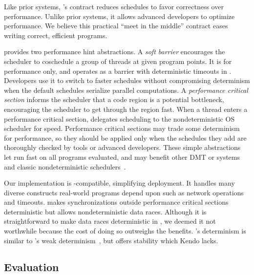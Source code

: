 Like prior systems, \parrot's contract reduces schedules to favor correctness 
over performance.  Unlike prior systems, it allows advanced developers
to optimize performance.  We believe this practical ``meet in the
middle'' contract eases writing correct, efficient programs.



\parrot provides two performance hint abstractions.  A \emph{soft
  barrier} encourages the scheduler to coschedule a group of threads at
given program points.  It is for performance only, and operates as a
barrier with deterministic timeouts in \parrot.  Developers use it to switch
to faster schedules without compromising determinism
when the default schedules serialize parallel
computations.  A \emph{performance critical section}
informs the scheduler that a code region is a potential
bottleneck, encouraging the scheduler to get through the region fast.
When a thread enters a performance critical section, \parrot delegates 
scheduling to the
nondeterministic OS scheduler for speed.  
Performance critical sections may trade some determinism for
performance, so they should be applied only when the schedules they add
are thoroughly checked by tools or advanced developers.
These simple abstractions
let \parrot run fast on all programs evaluated, and
may benefit other DMT or \smt systems and classic nondeterministic
schedulers~\cite{coschedule:sigmetrics96, coschedule, partial-barrier:atc06}.

Our \parrot implementation is \pthread-compatible, simplifying deployment.
It handles many diverse constructs real-world programs depend upon such as
network operations and timeouts.  \parrot makes synchronizations outside
performance critical sections deterministic but allows nondeterministic
data races.  Although it is
straightforward to make data races deterministic in \parrot,
we deemed it not worthwhile because the cost of doing so outweighs the
benefits.  \parrot's determinism is similar to
\kendo's weak determinism~\cite{kendo:asplos09}, but \parrot offers stability
which Kendo lacks.

\subsection{Evaluation} \label{sec:parrot-eval}

